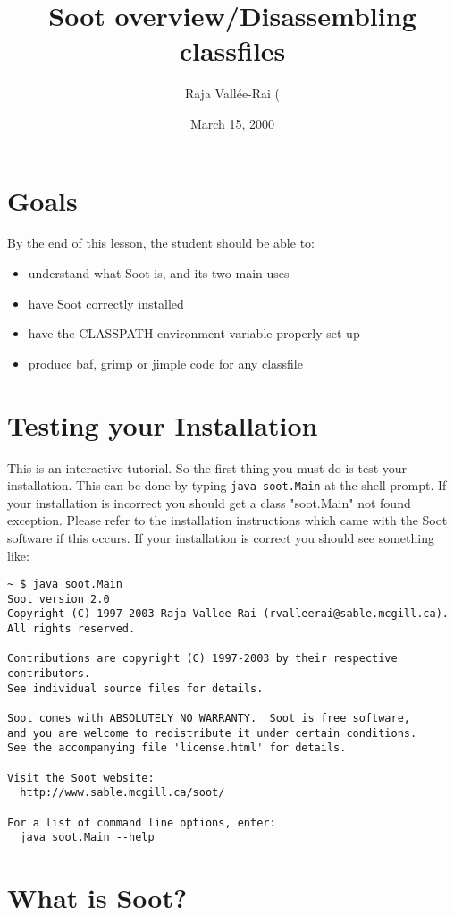 \documentclass{article}
\title{Soot overview/Disassembling classfiles}
\author{Raja Vall\'ee-Rai (\htmladdnormallink{rvalleerai@sable.mcgill.ca)}{mailto:rvalleerai@sable.mcgill.ca}}
\date{March 15, 2000}
\begin{document}
\maketitle

\section{Goals}

By the end of this lesson, the student should be able to:
\begin{itemize}
\item understand what Soot is, and its two main uses
\item have Soot correctly installed
\item have the CLASSPATH environment variable properly set up
\item produce baf, grimp or jimple code for any classfile
\end{itemize}

\section{Testing your Installation}

This is an interactive tutorial.  So the first thing you must do is
test your installation.  This can be done by typing {\tt java
soot.Main} at the shell prompt.  If your installation is incorrect you
should get a class "soot.Main" not found exception.  Please refer to
the installation instructions which came with the Soot software if
this occurs.  If your installation is correct you should see something
like:

\begin{verbatim}
~ $ java soot.Main
Soot version 2.0
Copyright (C) 1997-2003 Raja Vallee-Rai (rvalleerai@sable.mcgill.ca).
All rights reserved.

Contributions are copyright (C) 1997-2003 by their respective contributors.
See individual source files for details.

Soot comes with ABSOLUTELY NO WARRANTY.  Soot is free software,
and you are welcome to redistribute it under certain conditions.
See the accompanying file 'license.html' for details.

Visit the Soot website:
  http://www.sable.mcgill.ca/soot/

For a list of command line options, enter:
  java soot.Main --help
\end{verbatim}

\section{What is Soot?}
\end{document}
